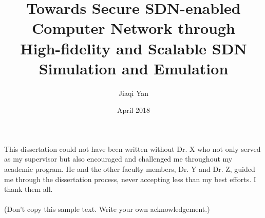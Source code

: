 \documentclass{iitthesis}
\theoremstyle{definition}
\begin{document}
\title{Towards Secure SDN-enabled Computer Network through \\
High-fidelity and Scalable SDN Simulation and Emulation}
\author{Jiaqi Yan}
\date{April 2018}
\copyrightnoticetrue      %
\maketitle                %


\prelimpages         %


\begin{acknowledgement}     %
\par  This dissertation could not have been written without Dr. X
who not only served as my supervisor but also encouraged and
challenged me throughout my academic program. He and the other
faculty members, Dr. Y and Dr. Z, guided me through the
dissertation process, never accepting less than my best efforts. I
thank them all.\\ \\ (Don't copy this sample text. Write your own
acknowledgement.)
\end{acknowledgement}


\tableofcontents
\clearpage

\listoftables

\clearpage

\listoffigures

\clearpage


\listofsymbols
{}

\clearpage
\end{document}

